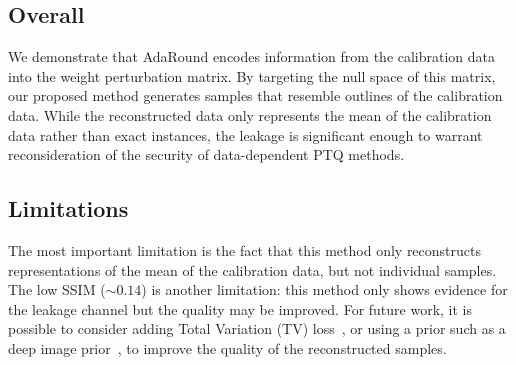\documentclass[../main.tex]{subfiles}
\begin{document}
\subsection{Overall}
We demonstrate that AdaRound encodes information from the calibration data into the weight perturbation matrix. By targeting the null space of this matrix, our proposed method generates samples that resemble outlines of the calibration data. While the reconstructed data only represents the mean of the calibration data rather than exact instances, the leakage is significant enough to warrant reconsideration of the security of data-dependent PTQ methods. 

\subsection{Limitations}
The most important limitation is the fact that this method only reconstructs representations of the mean of the calibration data, but not individual samples. The low SSIM ($\sim0.14$) is another limitation: this method only shows evidence for the leakage channel but the quality may be improved. For future work, it is possible to consider adding Total Variation (TV) loss~\cite{rudinNonlinearTotalVariation1992}, or using a prior such as a deep image prior~\cite{ulyanovDeepImagePrior2020}, to improve the quality of the reconstructed samples.
\end{document}
